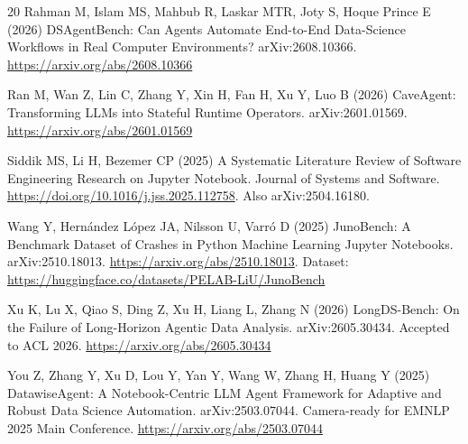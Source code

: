 \documentclass[11pt]{article}
\begin{document}
\begin{thebibliography}{20}
Rahman M, Islam MS, Mahbub R, Laskar MTR, Joty S, Hoque Prince E (2026)
DSAgentBench: Can Agents Automate End-to-End Data-Science Workflows in Real
Computer Environments? arXiv:2608.10366.
\url{https://arxiv.org/abs/2608.10366}

Ran M, Wan Z, Lin C, Zhang Y, Xin H, Fan H, Xu Y, Luo B (2026) CaveAgent:
Transforming LLMs into Stateful Runtime Operators. arXiv:2601.01569.
\url{https://arxiv.org/abs/2601.01569}

Siddik MS, Li H, Bezemer CP (2025) A Systematic Literature Review of
Software Engineering Research on Jupyter Notebook. Journal of Systems and
Software. \url{https://doi.org/10.1016/j.jss.2025.112758}. Also
arXiv:2504.16180.

Wang Y, Hernández López JA, Nilsson U, Varró D (2025) JunoBench: A Benchmark
Dataset of Crashes in Python Machine Learning Jupyter Notebooks.
arXiv:2510.18013. \url{https://arxiv.org/abs/2510.18013}. Dataset:
\url{https://huggingface.co/datasets/PELAB-LiU/JunoBench}

Xu K, Lu X, Qiao S, Ding Z, Xu H, Liang L, Zhang N (2026) LongDS-Bench: On
the Failure of Long-Horizon Agentic Data Analysis. arXiv:2605.30434.
Accepted to ACL 2026. \url{https://arxiv.org/abs/2605.30434}

You Z, Zhang Y, Xu D, Lou Y, Yan Y, Wang W, Zhang H, Huang Y (2025)
DatawiseAgent: A Notebook-Centric LLM Agent Framework for Adaptive and
Robust Data Science Automation. arXiv:2503.07044. Camera-ready for EMNLP
2025 Main Conference. \url{https://arxiv.org/abs/2503.07044}

\end{thebibliography}
\end{document}
